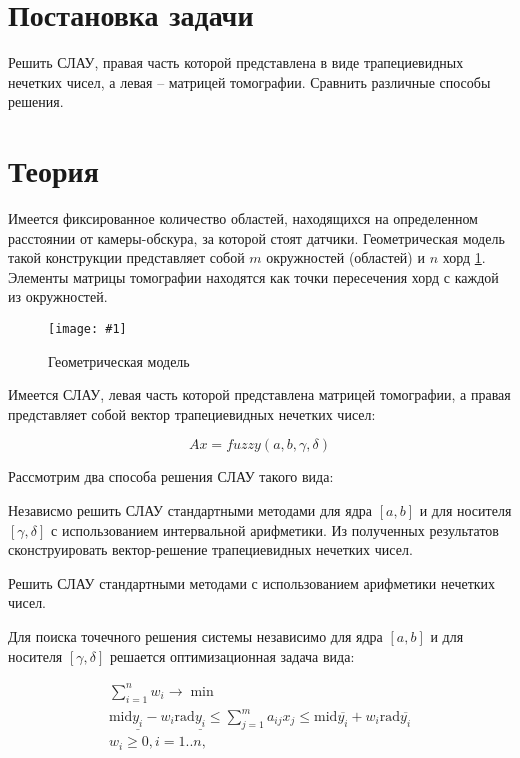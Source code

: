\documentclass[a4paper,12pt]{article}
\newcommand{\plot}[3]{
    \begin{figure}[H]
        \begin{center}
            \texttt{[image: \#1]}
            \caption{#2}
            \label{#3}
        \end{center}
    \end{figure}
}
\begin{document}
    
    \newpage

    \tableofcontents
    \listoffigures
    \newpage

    \section{Постановка задачи}
    \quad Решить СЛАУ, правая часть которой представлена в виде трапециевидных нечетких чисел, а левая -- матрицей томографии. Сравнить различные способы решения.
    
    \section{Теория}
    \quad Имеется фиксированное количество областей, находящихся на определенном расстоянии от камеры-обскура, за которой стоят датчики. Геометрическая модель такой конструкции представляет собой $ m $ окружностей (областей) и $ n $ хорд \ref{p:model}. Элементы матрицы томографии находятся как точки пересечения хорд с каждой из окружностей.

    \plot{img/tom.png}{Геометрическая модель}{p:model}

    \quad Имеется СЛАУ, левая часть которой представлена матрицей томографии, а правая представляет собой вектор трапециевидных нечетких чисел:

    \begin{equation}
        Ax = fuzzy(a, b, \gamma, \delta)
        \label{e:slau}
    \end{equation}

    Рассмотрим два способа решения СЛАУ такого вида:

    Независмо решить СЛАУ стандартными методами для ядра $ [a, b] $ и для носителя $ [\gamma, \delta] $ с использованием интервальной арифметики. Из полученных результатов сконструировать вектор-решение трапециевидных нечетких чисел.

    Решить СЛАУ стандартными методами с использованием арифметики нечетких чисел.

    Для поиска точечного решения системы независимо для ядра $ [a, b] $ и для носителя $ [\gamma, \delta] $ решается оптимизационная задача вида:

    \begin{equation}
        \begin{gathered}
            \sum_{i = 1}^{n}w_{i} \to \min \\
            \text{mid}\underline{y_i} - w_{i} \text{rad}\underline{y_i} \leq \sum_{j = 1}^{m}{a_{ij}x_j} \leq \text{mid}\overline{y_i} + w_{i} \text{rad}\overline{y_i} \\
            w_{i} \geq 0, i = 1..n, \\
        \end{gathered}
        \label{e:point}
    \end{equation}
\end{document}
